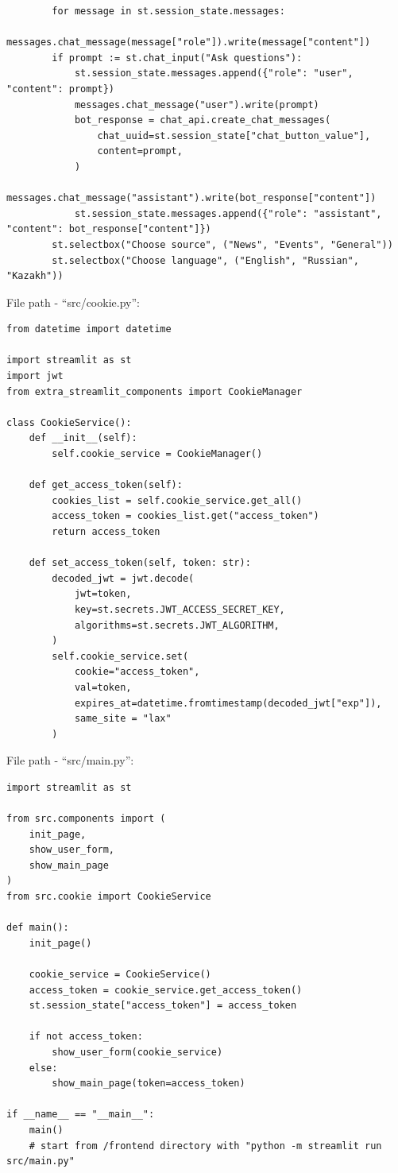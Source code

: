 \begin{lstlisting}
        for message in st.session_state.messages:
            messages.chat_message(message["role"]).write(message["content"])
        if prompt := st.chat_input("Ask questions"): 
            st.session_state.messages.append({"role": "user", "content": prompt})
            messages.chat_message("user").write(prompt)
            bot_response = chat_api.create_chat_messages(
                chat_uuid=st.session_state["chat_button_value"],
                content=prompt,
            )
            messages.chat_message("assistant").write(bot_response["content"])
            st.session_state.messages.append({"role": "assistant", "content": bot_response["content"]})
        st.selectbox("Choose source", ("News", "Events", "General"))
        st.selectbox("Choose language", ("English", "Russian", "Kazakh"))      
\end{lstlisting}

\clearpage

File path - ``src/cookie.py'':
\begin{lstlisting}
from datetime import datetime

import streamlit as st
import jwt
from extra_streamlit_components import CookieManager

class CookieService():
    def __init__(self):
        self.cookie_service = CookieManager()
    
    def get_access_token(self):
        cookies_list = self.cookie_service.get_all()
        access_token = cookies_list.get("access_token")
        return access_token
    
    def set_access_token(self, token: str):
        decoded_jwt = jwt.decode(
            jwt=token,
            key=st.secrets.JWT_ACCESS_SECRET_KEY,
            algorithms=st.secrets.JWT_ALGORITHM,
        )
        self.cookie_service.set(
            cookie="access_token",
            val=token,
            expires_at=datetime.fromtimestamp(decoded_jwt["exp"]),
            same_site = "lax"
        )
\end{lstlisting}

\clearpage

File path - ``src/main.py'':
\begin{lstlisting}
import streamlit as st

from src.components import (
    init_page,
    show_user_form,
    show_main_page
)
from src.cookie import CookieService

def main():
    init_page()
    
    cookie_service = CookieService()
    access_token = cookie_service.get_access_token()
    st.session_state["access_token"] = access_token
    
    if not access_token:
        show_user_form(cookie_service)
    else:
        show_main_page(token=access_token)
    
if __name__ == "__main__":
    main()
    # start from /frontend directory with "python -m streamlit run src/main.py"
\end{lstlisting}

\clearpage

